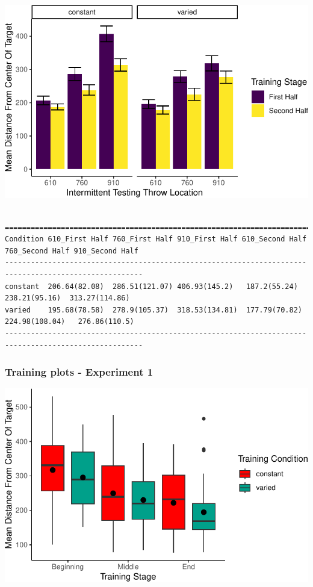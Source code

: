 \documentclass[
  12pt,
  letterpaper,
]{article}
\begin{document}
\includegraphics{full_files/figure-pdf/unnamed-chunk-67-1.pdf}

\begin{verbatim}

======================================================================================================
Condition 610_First Half 760_First Half 910_First Half 610_Second Half 760_Second Half 910_Second Half
------------------------------------------------------------------------------------------------------
constant  206.64(82.08)  286.51(121.07) 406.93(145.2)   187.2(55.24)    238.21(95.16)  313.27(114.86) 
varied    195.68(78.58)  278.9(105.37)  318.53(134.81)  177.79(70.82)  224.98(108.04)   276.86(110.5) 
------------------------------------------------------------------------------------------------------
\end{verbatim}

\subsubsection{Training plots - Experiment
1}\label{training-plots---experiment-1}

\includegraphics{full_files/figure-pdf/unnamed-chunk-68-1.pdf}
\end{document}
